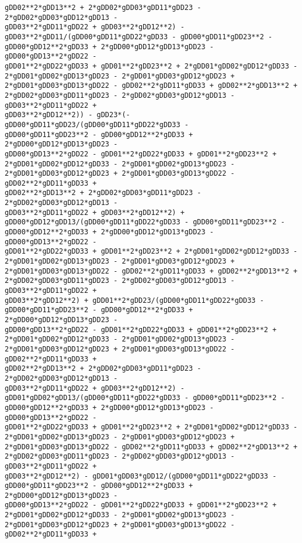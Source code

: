 \documentclass[landscape,letterpaper,10pt,english]{article}
\begin{document}
\begin{Verbatim}[commandchars=\\\{\}]
gDD02**2*gDD13**2 + 2*gDD02*gDD03*gDD11*gDD23 - 2*gDD02*gDD03*gDD12*gDD13 -
gDD03**2*gDD11*gDD22 + gDD03**2*gDD12**2) -
gDD03**2*gDD11/(gDD00*gDD11*gDD22*gDD33 - gDD00*gDD11*gDD23**2 -
gDD00*gDD12**2*gDD33 + 2*gDD00*gDD12*gDD13*gDD23 - gDD00*gDD13**2*gDD22 -
gDD01**2*gDD22*gDD33 + gDD01**2*gDD23**2 + 2*gDD01*gDD02*gDD12*gDD33 -
2*gDD01*gDD02*gDD13*gDD23 - 2*gDD01*gDD03*gDD12*gDD23 +
2*gDD01*gDD03*gDD13*gDD22 - gDD02**2*gDD11*gDD33 + gDD02**2*gDD13**2 +
2*gDD02*gDD03*gDD11*gDD23 - 2*gDD02*gDD03*gDD12*gDD13 - gDD03**2*gDD11*gDD22 +
gDD03**2*gDD12**2)) - gDD23*(-gDD00*gDD11*gDD23/(gDD00*gDD11*gDD22*gDD33 -
gDD00*gDD11*gDD23**2 - gDD00*gDD12**2*gDD33 + 2*gDD00*gDD12*gDD13*gDD23 -
gDD00*gDD13**2*gDD22 - gDD01**2*gDD22*gDD33 + gDD01**2*gDD23**2 +
2*gDD01*gDD02*gDD12*gDD33 - 2*gDD01*gDD02*gDD13*gDD23 -
2*gDD01*gDD03*gDD12*gDD23 + 2*gDD01*gDD03*gDD13*gDD22 - gDD02**2*gDD11*gDD33 +
gDD02**2*gDD13**2 + 2*gDD02*gDD03*gDD11*gDD23 - 2*gDD02*gDD03*gDD12*gDD13 -
gDD03**2*gDD11*gDD22 + gDD03**2*gDD12**2) +
gDD00*gDD12*gDD13/(gDD00*gDD11*gDD22*gDD33 - gDD00*gDD11*gDD23**2 -
gDD00*gDD12**2*gDD33 + 2*gDD00*gDD12*gDD13*gDD23 - gDD00*gDD13**2*gDD22 -
gDD01**2*gDD22*gDD33 + gDD01**2*gDD23**2 + 2*gDD01*gDD02*gDD12*gDD33 -
2*gDD01*gDD02*gDD13*gDD23 - 2*gDD01*gDD03*gDD12*gDD23 +
2*gDD01*gDD03*gDD13*gDD22 - gDD02**2*gDD11*gDD33 + gDD02**2*gDD13**2 +
2*gDD02*gDD03*gDD11*gDD23 - 2*gDD02*gDD03*gDD12*gDD13 - gDD03**2*gDD11*gDD22 +
gDD03**2*gDD12**2) + gDD01**2*gDD23/(gDD00*gDD11*gDD22*gDD33 -
gDD00*gDD11*gDD23**2 - gDD00*gDD12**2*gDD33 + 2*gDD00*gDD12*gDD13*gDD23 -
gDD00*gDD13**2*gDD22 - gDD01**2*gDD22*gDD33 + gDD01**2*gDD23**2 +
2*gDD01*gDD02*gDD12*gDD33 - 2*gDD01*gDD02*gDD13*gDD23 -
2*gDD01*gDD03*gDD12*gDD23 + 2*gDD01*gDD03*gDD13*gDD22 - gDD02**2*gDD11*gDD33 +
gDD02**2*gDD13**2 + 2*gDD02*gDD03*gDD11*gDD23 - 2*gDD02*gDD03*gDD12*gDD13 -
gDD03**2*gDD11*gDD22 + gDD03**2*gDD12**2) -
gDD01*gDD02*gDD13/(gDD00*gDD11*gDD22*gDD33 - gDD00*gDD11*gDD23**2 -
gDD00*gDD12**2*gDD33 + 2*gDD00*gDD12*gDD13*gDD23 - gDD00*gDD13**2*gDD22 -
gDD01**2*gDD22*gDD33 + gDD01**2*gDD23**2 + 2*gDD01*gDD02*gDD12*gDD33 -
2*gDD01*gDD02*gDD13*gDD23 - 2*gDD01*gDD03*gDD12*gDD23 +
2*gDD01*gDD03*gDD13*gDD22 - gDD02**2*gDD11*gDD33 + gDD02**2*gDD13**2 +
2*gDD02*gDD03*gDD11*gDD23 - 2*gDD02*gDD03*gDD12*gDD13 - gDD03**2*gDD11*gDD22 +
gDD03**2*gDD12**2) - gDD01*gDD03*gDD12/(gDD00*gDD11*gDD22*gDD33 -
gDD00*gDD11*gDD23**2 - gDD00*gDD12**2*gDD33 + 2*gDD00*gDD12*gDD13*gDD23 -
gDD00*gDD13**2*gDD22 - gDD01**2*gDD22*gDD33 + gDD01**2*gDD23**2 +
2*gDD01*gDD02*gDD12*gDD33 - 2*gDD01*gDD02*gDD13*gDD23 -
2*gDD01*gDD03*gDD12*gDD23 + 2*gDD01*gDD03*gDD13*gDD22 - gDD02**2*gDD11*gDD33 +

\end{Verbatim}
\end{document}

